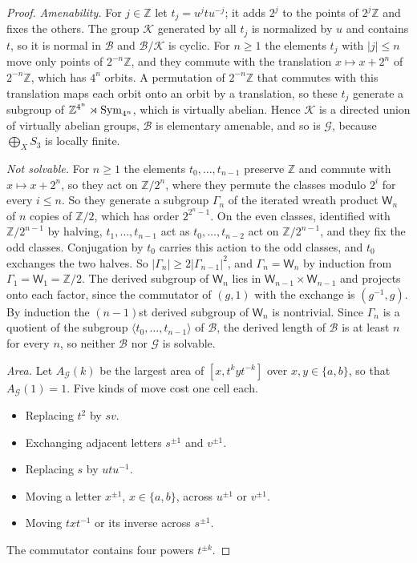 \begin{proof}
\emph{Amenability.} For $j\in\mathbb Z$ let $t_j=u^jtu^{-j}$; it adds $2^j$ to the points of $2^j\mathbb Z$ and fixes the others. The group $\mathcal K$
generated by all $t_j$ is normalized by $u$ and contains $t$, so it is normal in $\mathcal B$ and $\mathcal B/\mathcal K$ is cyclic. For $n\ge1$ the elements $t_j$ with
$|j|\le n$ move only points of $2^{-n}\mathbb Z$, and they commute with the translation $x\mapsto x+2^n$ of $2^{-n}\mathbb Z$, which has $4^n$
orbits. A permutation of $2^{-n}\mathbb Z$ that commutes with this translation maps each orbit onto an orbit by a translation, so these $t_j$ generate a subgroup of
$\mathbb Z^{4^n}\rtimes\operatorname{Sym}_{4^n}$, which is virtually abelian. Hence $\mathcal K$ is a directed union of virtually abelian groups, $\mathcal B$ is elementary
amenable, and so is $\mathcal G$, because $\bigoplus_XS_3$ is locally finite.

\emph{Not solvable.} For $n\ge1$ the elements $t_0,\dots,t_{n-1}$ preserve $\mathbb Z$ and commute with $x\mapsto x+2^n$, so they act on
$\mathbb Z/2^n$, where they permute the classes modulo $2^i$ for every $i\le n$. So they generate a subgroup $\Gamma_n$ of the iterated wreath
product $\mathsf W_n$ of $n$ copies of $\mathbb Z/2$, which has order $2^{2^n-1}$. On the even classes, identified with $\mathbb Z/2^{n-1}$ by
halving, $t_1,\dots,t_{n-1}$ act as $t_0,\dots,t_{n-2}$ act on $\mathbb Z/2^{n-1}$, and they fix the odd classes. Conjugation by $t_0$ carries
this action to the odd classes, and $t_0$ exchanges the two halves. So $|\Gamma_n|\ge2|\Gamma_{n-1}|^2$, and $\Gamma_n=\mathsf W_n$ by induction from $\Gamma_1=\mathsf W_1=\mathbb Z/2$. The derived
subgroup of $\mathsf W_n$ lies in $\mathsf W_{n-1}\times\mathsf W_{n-1}$ and projects onto each factor, since the commutator of $(g,1)$ with the
exchange is $(g^{-1},g)$. By induction the $(n-1)$st derived subgroup of $\mathsf W_n$ is nontrivial. Since $\Gamma_n$ is a quotient of the subgroup
$\langle t_0,\dots,t_{n-1}\rangle$ of $\mathcal B$, the derived length of $\mathcal B$ is at least $n$ for every $n$, so neither $\mathcal B$ nor
$\mathcal G$ is solvable.

\emph{Area.} Let $A_{\mathcal G}(k)$ be the largest area of $[x,t^kyt^{-k}]$ over $x,y\in\{a,b\}$, so that $A_{\mathcal G}(1)=1$. Five kinds of move
cost one cell each.
\begin{itemize}[nosep,leftmargin=*]
\item Replacing $t^2$ by $sv$.
\item Exchanging adjacent letters $s^{\pm1}$ and $v^{\pm1}$.
\item Replacing $s$ by $utu^{-1}$.
\item Moving a letter $x^{\pm1}$, $x\in\{a,b\}$, across $u^{\pm1}$ or $v^{\pm1}$.
\item Moving $txt^{-1}$ or its inverse across $s^{\pm1}$.
\end{itemize}
The commutator contains four powers $t^{\pm k}$.


\end{proof}
